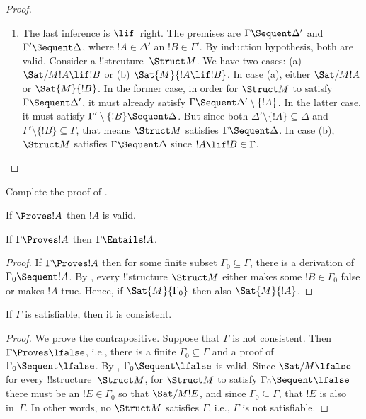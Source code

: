 \documentclass[../../include/open-logic-section]{subfiles}
\begin{document}
\begin{proof}
\begin{enumerate}
\item The last inference is $\lif$~right. The premises are $\Gamma
  \Sequent \Delta'$ and $\Gamma' \Sequent \Delta$, where $!A \in
  \Delta'$ an $!B \in \Gamma'$.  By induction hypothesis, both are
  valid.  Consider a !!{strcuture}~$\Struct M$.  We have two cases:
  (a) $\Sat/{M}{!A \lif !B}$ or (b) $\Sat{M}{!A \lif !B}$. In case
  (a), either $\Sat/{M}{!A}$ or $\Sat{M}{!B}$.  In the former case, in
  order for $\Struct M$ to satisfy $\Gamma \Sequent \Delta'$, it must
  already satisfy $\Gamma \Sequent \Delta' \setminus \{!A\}$.  In the
  latter case, it must satisfy $\Gamma' \setminus \{!B\} \Sequent
  \Delta$.  But since both $\Delta' \setminus \{!A\} \subseteq \Delta$
  and $\Gamma' \setminus \{!B\} \subseteq \Gamma$, that means $\Struct
  M$ satisfies $\Gamma \Sequent \Delta$.  In case (b), $\Struct M$
  satisfies $\Gamma \Sequent \Delta$ since $!A \lif !B \in \Gamma$.
\end{enumerate}
\end{proof}

\begin{prob}
Complete the proof of .
\end{prob}

\begin{cor}
If $\Proves !A$ then $!A$ is valid.
\end{cor}

\begin{cor}
If $\Gamma \Proves !A$ then $\Gamma \Entails !A$.
\end{cor}

\begin{proof}
If $\Gamma \Proves !A$ then for some finite subset $\Gamma_0 \subseteq
\Gamma$, there is a derivation of $\Gamma_0 \Sequent !A$. By
, every !!{structure} $\Struct M$ either
makes some $!B \in \Gamma_0$ false or makes $!A$ true.  Hence, if
$\Sat{M}{\Gamma_0}$ then also $\Sat{M}{!A}$.
\end{proof}

\begin{cor}
If $\Gamma$ is satisfiable, then it is consistent.
\end{cor}

\begin{proof}
We prove the contrapositive. Suppose that $\Gamma$ is not
consistent. Then $\Gamma \Proves \lfalse$, i.e., there is a finite
$\Gamma_0 \subseteq \Gamma$ and a proof of $\Gamma_0 \Sequent
\lfalse$. By , $\Gamma_0 \Sequent \lfalse$ is
valid.  Since $\Sat/{M}{\lfalse}$ for every !!{structure}~$\Struct M$,
for $\Struct M$ to satisfy $\Gamma_0 \Sequent \lfalse$ there must be
an $!E \in \Gamma_0$ so that $\Sat/{M}{!E}$, and since $\Gamma_0
\subseteq \Gamma$, that $!E$ is also in~$\Gamma$.  In other words, no
$\Struct M$ satisfies $\Gamma$, i.e., $\Gamma$ is not satisfiable.
\end{proof}
\end{document}
